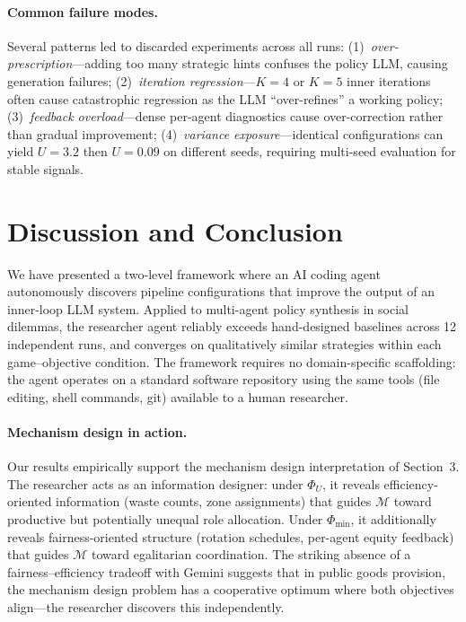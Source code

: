 \documentclass[10pt,twocolumn]{article}
\newcommand{\cM}{\mathcal{M}}
\begin{document}
\paragraph{Common failure modes.}
Several patterns led to discarded experiments across all runs: (1)~\emph{over-prescription}---adding too many strategic hints confuses the policy LLM, causing generation failures; (2)~\emph{iteration regression}---$K{=}4$ or $K{=}5$ inner iterations often cause catastrophic regression as the LLM ``over-refines'' a working policy; (3)~\emph{feedback overload}---dense per-agent diagnostics cause over-correction rather than gradual improvement; (4)~\emph{variance exposure}---identical configurations can yield $U{=}3.2$ then $U{=}0.09$ on different seeds, requiring multi-seed evaluation for stable signals.

\section{Discussion and Conclusion}

We have presented a two-level framework where an AI coding agent autonomously discovers pipeline configurations that improve the output of an inner-loop LLM system. Applied to multi-agent policy synthesis in social dilemmas, the researcher agent reliably exceeds hand-designed baselines across 12 independent runs, and converges on qualitatively similar strategies within each game--objective condition. The framework requires no domain-specific scaffolding: the agent operates on a standard software repository using the same tools (file editing, shell commands, git) available to a human researcher.

\paragraph{Mechanism design in action.}
Our results empirically support the mechanism design interpretation of Section~3. The researcher acts as an information designer: under $\Phi_U$, it reveals efficiency-oriented information (waste counts, zone assignments) that guides $\cM$ toward productive but potentially unequal role allocation. Under $\Phi_{\min}$, it additionally reveals fairness-oriented structure (rotation schedules, per-agent equity feedback) that guides $\cM$ toward egalitarian coordination. The striking absence of a fairness--efficiency tradeoff with Gemini suggests that in public goods provision, the mechanism design problem has a cooperative optimum where both objectives align---the researcher discovers this independently.
\end{document}
